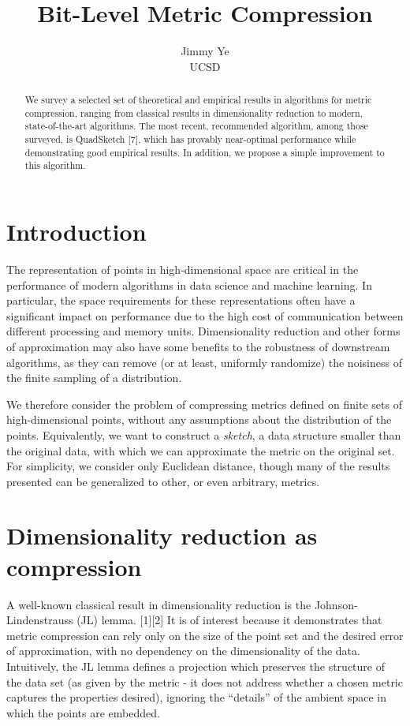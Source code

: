 \documentclass{article}
\title{Bit-Level Metric Compression}
\author{%
  Jimmy Ye \\
  UCSD
}
\begin{document}

\maketitle

\begin{abstract}
  We survey a selected set of theoretical and empirical results in algorithms
  for metric compression, ranging from classical results in dimensionality
  reduction to modern, state-of-the-art algorithms. The most recent, recommended
  algorithm, among those surveyed, is QuadSketch [7], which has provably
  near-optimal performance while demonstrating good empirical results. In
  addition, we propose a simple improvement to this algorithm.
\end{abstract}


\section{Introduction}

The representation of points in high-dimensional space are critical in the
performance of modern algorithms in data science and machine learning. In
particular, the space requirements for these representations often have a
significant impact on performance due to the high cost of communication between
different processing and memory units. Dimensionality reduction and other forms
of approximation may also have some benefits to the robustness of downstream
algorithms, as they can remove (or at least, uniformly randomize) the noisiness
of the finite sampling of a distribution.

We therefore consider the problem of compressing metrics defined on finite sets
of high-dimensional points, without any assumptions about the distribution of
the points. Equivalently, we want to construct a \textit{sketch}, a data
structure smaller than the original data, with which we can approximate the
metric on the original set. For simplicity, we consider only Euclidean distance,
though many of the results presented can be generalized to other, or even
arbitrary, metrics.

\section{Dimensionality reduction as compression}

A well-known classical result in dimensionality reduction is the
Johnson-Lindenstrauss (JL) lemma. [1][2] It is of interest because it
demonstrates that metric compression can rely only on the size of the point set
and the desired error of approximation, with no dependency on the dimensionality
of the data. Intuitively, the JL lemma defines a projection which preserves the
structure of the data set (as given by the metric - it does not address whether
a chosen metric captures the properties desired), ignoring the ``details'' of
the ambient space in which the points are embedded.
\end{document}
